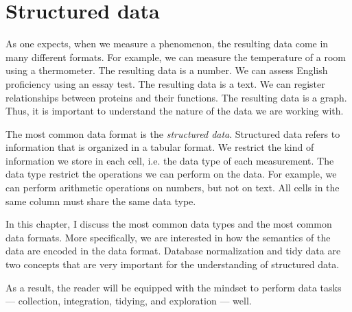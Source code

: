 \chapter{Structured data}
\label{chap:data}
\glsresetall


As one expects, when we measure a phenomenon, the resulting data come in many different
formats.  For example, we can measure the temperature of a room using a thermometer.  The
resulting data is a number.  We can assess English proficiency using an essay test.  The
resulting data is a text.  We can register relationships between proteins and their
functions.  The resulting data is a graph.  Thus, it is important to understand the nature
of the data we are working with.

The most common data format is the \emph{structured data}.  Structured data refers to
information that is organized in a tabular format.
We restrict the kind of information we store in each cell, i.e. the data type of each
measurement.  The data type restrict the operations we can
perform on the data.  For example, we can perform arithmetic operations on numbers, but
not on text.  All cells in the same column must share the same data type.

In this chapter, I discuss the most common data types and the most common data formats.
More specifically, we are interested in how the semantics of the data are encoded in the
data format.  Database normalization and tidy data are two concepts that are very important
for the understanding of structured data.

As a result, the reader will be equipped with the mindset to perform data tasks
--- collection, integration, tidying, and exploration --- well.

